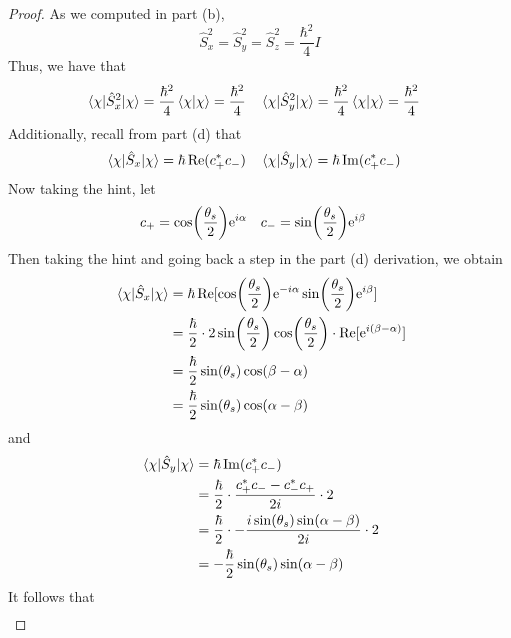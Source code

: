 \documentclass[../psets.tex]{subfiles}
\begin{document}
\begin{enumerate}
\begin{enumerate}
\begin{proof}
            As we computed in part (b),
            \begin{equation*}
                \hat{S}_x^2 = \hat{S}_y^2
                = \hat{S}_z^2
                = \frac{\hbar^2}{4}I
            \end{equation*}
            Thus, we have that
            \begin{align*}
                \ev{\hat{S}_x^2}{\chi} &= \frac{\hbar^2}{4}\braket{\chi} = \frac{\hbar^2}{4}&
                \ev{\hat{S}_y^2}{\chi} &= \frac{\hbar^2}{4}\braket{\chi} = \frac{\hbar^2}{4}
            \end{align*}
            Additionally, recall from part (d) that
            \begin{align*}
                \ev{\hat{S}_x}{\chi} &= \hbar\re(c_+^*c_-)&
                \ev{\hat{S}_y}{\chi} &= \hbar\im(c_+^*c_-)
            \end{align*}
            Now taking the hint, let
            \begin{align*}
                c_+ &= \cos(\frac{\theta_s}{2})\e[i\alpha]&
                c_- &= \sin(\frac{\theta_s}{2})\e[i\beta]
            \end{align*}
            Then taking the hint and going back a step in the part (d) derivation, we obtain
            \begin{align*}
                \ev{\hat{S}_x}{\chi} &= \hbar\re[\cos(\frac{\theta_s}{2})\e[-i\alpha]\sin(\frac{\theta_s}{2})\e[i\beta]]\\
                &= \frac{\hbar}{2}\cdot 2\sin(\frac{\theta_s}{2})\cos(\frac{\theta_s}{2})\cdot\re[\e[i(\beta-\alpha)]]\\
                &= \frac{\hbar}{2}\sin(\theta_s)\cos(\beta-\alpha)\\
                &= \frac{\hbar}{2}\sin(\theta_s)\cos(\alpha-\beta)
            \end{align*}
            and
            \begin{align*}
                \ev{\hat{S}_y}{\chi} &= \hbar\im(c_+^*c_-)\\
                &= \frac{\hbar}{2}\cdot\frac{c_+^*c_--c_-^*c_+}{2i}\cdot 2\\
                &= \frac{\hbar}{2}\cdot -\frac{i\sin(\theta_s)\sin(\alpha-\beta)}{2i}\cdot 2\\
                &= -\frac{\hbar}{2}\sin(\theta_s)\sin(\alpha-\beta)
            \end{align*}
            It follows that
            \begin{align*}

\end{align*}
\end{proof}
\end{enumerate}
\end{enumerate}
\end{document}
